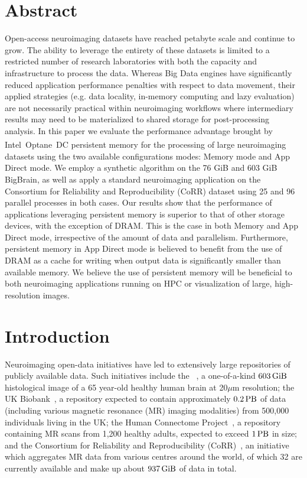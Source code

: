 \section{Abstract}
    Open-access neuroimaging datasets have reached petabyte scale and continue
to grow. The ability to leverage the entirety of these datasets is limited to a
restricted number of research laboratories with both the capacity and
infrastructure to process the data. Whereas Big Data engines have significantly
reduced application performance penalties with respect to data movement, their
applied strategies (e.g. data locality, in-memory computing and lazy evaluation)
are not necessarily practical within neuroimaging workflows where intermediary
results may need to be materialized to shared storage for post-processing
analysis. In this paper we evaluate the performance advantage brought by
Intel\textsuperscript{\textregistered}~Optane\texttrademark~DC persistent memory
for the processing of large neuroimaging datasets using the two available
configurations modes: Memory mode and App Direct mode. We employ a synthetic
algorithm on the 76 GiB and 603 GiB BigBrain, as well as apply a standard
neuroimaging application on the Consortium for Reliability and Reproducibility
(CoRR) dataset using 25 and 96 parallel processes in both cases. Our results
show that the performance of applications leveraging persistent memory is
superior to that of other storage devices, with the exception of DRAM. This is
the case in both Memory and App Direct mode, irrespective of the amount of data
and parallelism. Furthermore, persistent memory in App Direct mode is believed
to benefit from the use of DRAM as a cache for writing when output data is
significantly smaller than available memory. We believe the use of persistent
memory will be beneficial to both neuroimaging applications running on HPC or
visualization of large, high-resolution images.

\section{Introduction}
Neuroimaging open-data initiatives have led to extensively large repositories of
publicly available data. Such initiatives include the
\bigbrain~\cite{amunts2013bigbrain}, a one-of-a-kind $\SI{603}{\gibi\byte}$
histological image of a 65 year-old healthy human brain at 20$\mu$m resolution;
the UK Biobank~\cite{ukbiobank}, a repository expected to contain approximately
$\SI{0.2}{\peta\byte}$ of data (including various magnetic resonance (MR)
imaging modalities) from 500,000 individuals living in the UK; the Human
Connectome Project~\cite{HCP}, a repository containing MR scans from 1,200
healthy adults, expected to exceed $\SI{1}{\peta\byte}$ in size; and the
Consortium for Reliability and Reproducibility (CoRR)~\cite{corr}, an initiative
which aggregates MR data from various centres around the world, of which 32 are
currently available and make up about $\SI{937}{\gibi\byte}$ of data in total.

